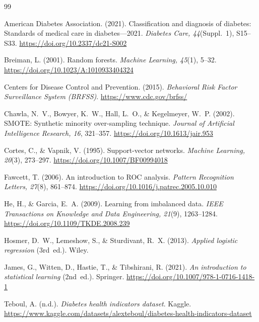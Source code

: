 \documentclass[11pt,a4paper]{article}
\begin{document}
\begin{thebibliography}{99}

American Diabetes Association. (2021).
Classification and diagnosis of diabetes: Standards of medical care in diabetes---2021.
\textit{Diabetes Care, 44}(Suppl.~1), S15--S33.
\url{https://doi.org/10.2337/dc21-S002}

Breiman, L. (2001).
Random forests.
\textit{Machine Learning, 45}(1), 5--32.
\url{https://doi.org/10.1023/A:1010933404324}

Centers for Disease Control and Prevention. (2015).
\textit{Behavioral Risk Factor Surveillance System (BRFSS)}.
\url{https://www.cdc.gov/brfss/}

Chawla, N.~V., Bowyer, K.~W., Hall, L.~O., \& Kegelmeyer, W.~P. (2002).
SMOTE: Synthetic minority over-sampling technique.
\textit{Journal of Artificial Intelligence Research, 16}, 321--357.
\url{https://doi.org/10.1613/jair.953}

Cortes, C., \& Vapnik, V. (1995).
Support-vector networks.
\textit{Machine Learning, 20}(3), 273--297.
\url{https://doi.org/10.1007/BF00994018}

Fawcett, T. (2006).
An introduction to ROC analysis.
\textit{Pattern Recognition Letters, 27}(8), 861--874.
\url{https://doi.org/10.1016/j.patrec.2005.10.010}

He, H., \& Garcia, E.~A. (2009).
Learning from imbalanced data.
\textit{IEEE Transactions on Knowledge and Data Engineering, 21}(9), 1263--1284.
\url{https://doi.org/10.1109/TKDE.2008.239}

Hosmer, D.~W., Lemeshow, S., \& Sturdivant, R.~X. (2013).
\textit{Applied logistic regression} (3rd~ed.).
Wiley.

James, G., Witten, D., Hastie, T., \& Tibshirani, R. (2021).
\textit{An introduction to statistical learning} (2nd~ed.).
Springer.
\url{https://doi.org/10.1007/978-1-0716-1418-1}

Teboul, A. (n.d.).
\textit{Diabetes health indicators dataset}.
Kaggle.
\url{https://www.kaggle.com/datasets/alexteboul/diabetes-health-indicators-dataset}

\end{thebibliography}
\end{document}
